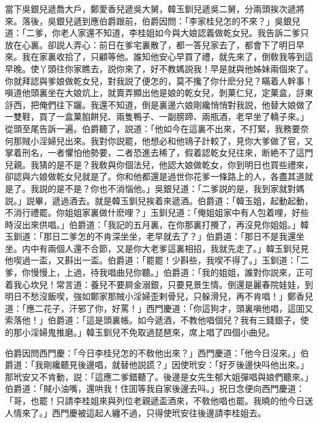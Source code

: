 當下吳銀兒遞喬大戶，鄭愛香兒遞吳大舅，韓玉釧兒遞吳二舅，分兩頭挨次遞將來。落後，吳銀兒遞到應伯爵跟前，伯爵因問：「李家桂兒怎的不來？」吳銀兒道：「二爹，你老人家還不知道，李桂姐如今與大娘認義做乾女兒。我告訴二爹只放在心裏。卻説人弄心：前日在爹宅裏散了，都一答兒家去了，都會下了明日早來。我在家裏收拾了，只顧等他。誰知他安心早買了禮，就先來了，倒敎我等到這早晚。使丫頭往你家瞧去，説你來了，好不教媽説我！早是就與他姊妹兩個來了。你就拜認與爹娘做乾女兒，對我説了便怎的，莫不攙了你什麽分兒？瞞着人幹事！嗔道他頭裏坐在大娘炕上，就賣弄顯出他是娘的乾女兒，剝菓仁兒，定菓盒，㧱東㧱西，把俺們往下躧。我還不知道，倒是裏邊六娘剛纔悄悄對我説，他替大娘做了一雙鞋，買了一盒菓餡餅兒、兩隻鴨子、一副膀蹄、兩瓶酒，老早坐了轎子來。」從頭至尾告訴一遍。伯爵聽了，説道：「他如今在這裏不出來，不打緊，我務要奈何那賊小淫婦兒出來。我對你説罷，他想必和他鴇子計較了，見你大爹做了官，又掌着刑名，一者懼怕他勢要，二者恐進去稀了，假着認乾女兒往來，断絶不了這門兒親。我猜的是不是？我敎與你個法兒，他認大娘做乾女，你到明日也買些禮來，卻認與六娘做乾女兒就是了。你和他都還是過世你花爹一條路上的人，各盡其道就是了。我説的是不是？你也不消惱他。」吳銀兒道：「二爹説的是，我到家就對媽説。」説畢，遞過酒去。就是韓玉釧兒挨着來遞酒。伯爵道：「韓玉姐，起動起動，不消行禮罷。你姐姐家裏做什麽哩？」玉釧兒道：「俺姐姐家中有人包着哩，好些時沒出來供唱。」伯爵道：「我記的五月裏，在你那裏打攪了，再沒見你姐姐。」韓玉釧道：「那日二爹怎的不肯深坐坐，老早就去了？」伯爵道：「那日不是我還坐坐。内中有兩個人還不合節，又是你大老爹這裏相招，我就先走了。」韓玉釧兒見他喫過一盃，又斟出一盃。伯爵道：「罷罷！少斟些，我喫不得了。」玉釧道：「二爹，你慢慢上，上過，待我唱曲兒你聽。」伯爵道：「我的姐姐，誰對你説來，正可着我心坎兒！常言道：養兒不要屙金溺銀，只要見景生情。倒還是麗春院娃娃，到明日不愁沒飯喫，強如鄭家那賊小淫婦歪剌骨兒，只躲滑兒，再不肯唱！」鄭香兒道：「應二花子，汗邪了你，好罵！」西門慶道：「你這狗才，頭裏嗔他唱，這囬又索落他！」伯爵道：「這是頭裏帳。如今遞酒，不教他唱個兒？我有三錢銀子，使的那小淫婦鬼推磨。」韓玉釧兒不免取過琵琶來，席上唱了四個小曲兒。

伯爵因問西門慶：「今日李桂兒怎的不敎他出來？」西門慶道：「他今日沒來。」伯爵道：「我剛纔聽見後邊唱，就替他説謊？」因使玳安：「好歹後邊快呌他出來。」那玳安又不肯動，説：「這應二爹錯聽了。後邊是女先生郁大姐彈唱與娘們聽來。」伯爵道：「賊小油嘴，還哄我！住囬等我自家後邊去呌。」祝日念便向西門慶道：「哥，也罷！只請李桂姐來與列位老親遞盃酒來，不敎他唱也罷。我曉的他今日送人情來了。」西門慶被這起人纏不過，只得使玳安往後邊請李桂姐去。

